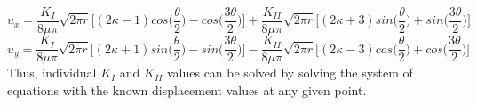 \documentclass[12pt]{article}
\begin{document}
\begin{equation}
u_{x} = \frac{K_{I}}{8\mu \pi}\sqrt{2\pi r}\bigg[(2\kappa-1)cos\bigg(\frac{\theta}{2}\bigg)-cos\bigg(\frac{3\theta}{2}\bigg)\bigg] + \frac{K_{II}}{8\mu \pi}\sqrt{2\pi r}\bigg[(2\kappa+3)sin\bigg(\frac{\theta}{2}\bigg)+sin\bigg(\frac{3\theta}{2}\bigg)\bigg]
\end{equation}
\begin{equation}
u_{y} = \frac{K_{I}}{8\mu \pi}\sqrt{2\pi r}\bigg[(2\kappa+1)sin\bigg(\frac{\theta}{2}\bigg)-sin\bigg(\frac{3\theta}{2}\bigg)\bigg]-\frac{K_{II}}{8\mu \pi}\sqrt{2\pi r}\bigg[(2\kappa-3)cos\bigg(\frac{\theta}{2}\bigg)+cos\bigg(\frac{3\theta}{2}\bigg)\bigg]
\end{equation}
Thus, individual $K_{I}$ and $K_{II}$ values can be solved by solving the system of equations with the known displacement values at any given point.    
\end{document}
